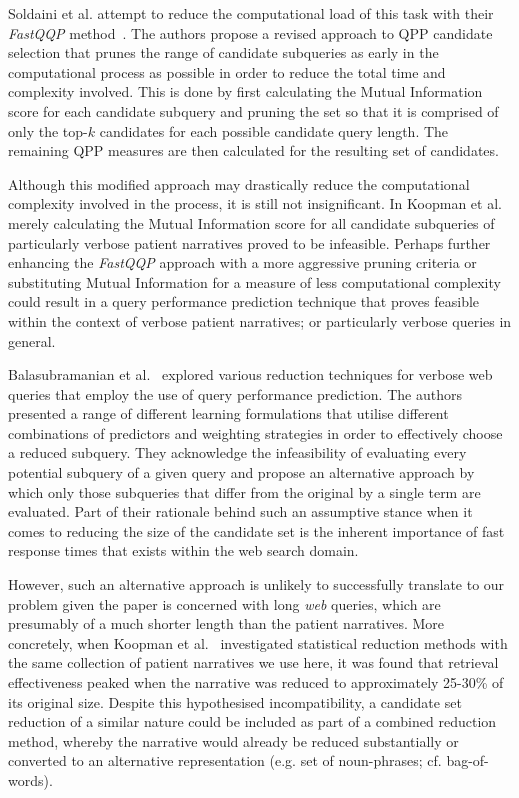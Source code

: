 \documentclass[a4paper]{report}
\begin{document}
Soldaini et al. attempt to reduce the computational load of this task with their \textit{FastQQP} method~\cite{Soldaini2015RetrievingML}. The authors propose a revised approach to QPP candidate selection that prunes the range of candidate subqueries as early in the computational process as possible in order to reduce the total time and complexity involved. This is done by first calculating the Mutual Information score for each candidate subquery and pruning the set so that it is comprised of only the top-$k$ candidates for each possible candidate query length. The remaining QPP measures are then calculated for the resulting set of candidates. 

Although this modified approach may drastically reduce the computational complexity involved in the process, it is still not insignificant. In Koopman et al.~\cite{koopman2017generating} merely calculating the Mutual Information score for all candidate subqueries of particularly verbose patient narratives proved to be infeasible. Perhaps further enhancing the \textit{FastQQP} approach with a more aggressive pruning criteria or substituting Mutual Information for a measure of less computational complexity could result in a query performance prediction technique that proves feasible within the context of verbose patient narratives; or particularly verbose queries in general.

Balasubramanian et al.~\citep{Balasubramanian:2010:ERL:1835449.1835545} explored various reduction techniques for verbose web queries that employ the use of query performance prediction. The authors presented a range of different learning formulations that utilise different combinations of predictors and weighting strategies in order to effectively choose a reduced subquery. They acknowledge the infeasibility of evaluating every potential subquery of a given query and propose an alternative approach by which only those subqueries that differ from the original by a single term are evaluated. Part of their rationale behind such an assumptive stance when it comes to reducing the size of the candidate set is the inherent importance of fast response times that exists within the web search domain. 

However, such an alternative approach is unlikely to successfully translate to our problem given the paper is concerned with long \textit{web} queries, which are presumably of a much shorter length than the patient narratives. More concretely, when Koopman et al.~\citep{koopman2017generating} investigated statistical reduction methods with the same collection of patient narratives we use here, it was found that retrieval effectiveness peaked when the narrative was reduced to approximately 25-30\% of its original size. Despite this hypothesised incompatibility, a candidate set reduction of a similar nature could be included as part of a combined reduction method, whereby the narrative would already be reduced substantially or converted to an alternative representation (e.g. set of noun-phrases; cf. bag-of-words). 
\end{document}
